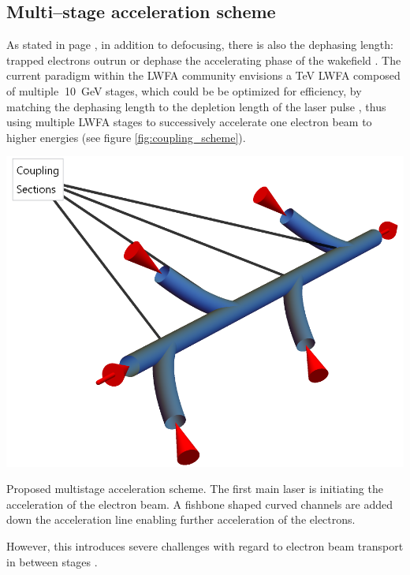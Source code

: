 \documentclass[../main.tex]{subfiles}
\begin{document}
\subsection{Multi--stage acceleration scheme}

As stated in page \pageref{dephasing-length}, in addition to defocusing, there is also the dephasing length: trapped electrons outrun or dephase the accelerating phase of the wakefield \cite{Esarey2009PhysicsAccelerators}. The current paradigm within the LWFA community envisions a \si{\TeV} LWFA composed of multiple $~$\SI{10}{\GeV} stages, which could be be optimized for efficiency, by matching the dephasing length to the depletion length of the laser pulse \cite{Schroeder2010PhysicsColliders}, thus using multiple LWFA stages to successively accelerate one electron beam to higher energies (see figure \ref{fig:coupling_scheme}).
\begin{marginfigure}
\includegraphics[width=\marginparwidth]{figures/cad/coupling_scheme.png}
\caption{Proposed multistage acceleration scheme. The first main laser is initiating the acceleration of the electron beam. A fishbone shaped curved channels are added down the acceleration line enabling further acceleration of the electrons.}
\label{fig:coupling_scheme}
\end{marginfigure}
However, this introduces severe challenges with regard to electron beam transport in between stages \cite{Esarey2009PhysicsAccelerators}.
\end{document}
